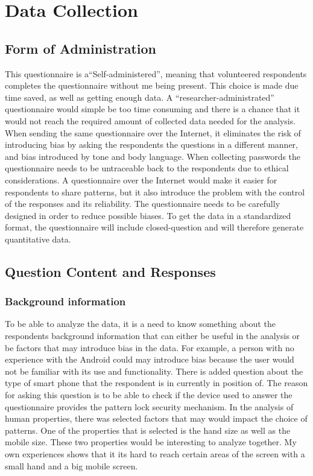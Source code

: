 \section{Data Collection}

  \subsection{Form of Administration}

    This questionnaire is a``Self-administered'', meaning that volunteered respondents completes the questionnaire without me being present. This choice is made due time saved, as well as getting enough data. A ``researcher-administrated'' questionnaire would simple be too time consuming and there is a chance that it would not reach the required amount of collected data needed for the analysis. When sending the same questionnaire over the Internet, it eliminates the risk of introducing bias by asking the respondents the questions in a different manner, and bias introduced by tone and body language. When collecting passwords the questionnaire needs to be untraceable back to the respondents due to ethical considerations. A questionnaire over the Internet would make it easier for respondents to share patterns, but it also introduce the problem with the control of the responses and its reliability. The questionnaire needs to be carefully designed in order to reduce possible biases. To get the data in a standardized format, the questionnaire will include closed-question and will therefore generate quantitative data. 

  \subsection{Question Content and Responses}

    \subsubsection*{Background information}
    To be able to analyze the data, it is a need to know something about the respondents background information that can either be useful in the analysis or be factors that may introduce bias in the data. For example, a person with no experience with the Android could may introduce bias because the user would not be familiar with its use and functionality. There is added question about the type of smart phone that the respondent is in currently in position of. The reason for asking this question is to be able to  check if the device used to answer the questionnaire provides the pattern lock security mechanism. In the analysis of human properties, there was selected factors that may would impact the choice of patterns. One of the properties that is selected is the hand size as well as the mobile size. These two properties would be interesting to analyze together. My own experiences shows that it its hard to reach certain areas of the screen with a small hand and a big mobile screen. \\

